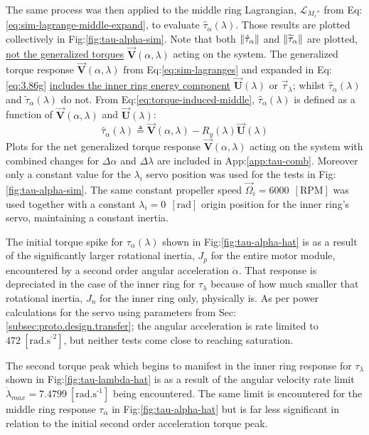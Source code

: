 The same process was then applied to the middle ring Lagrangian, $\mathcal{L}_{M_i''}$ from Eq:\ref{eq:sim-lagrange-middle-expand}, to evaluate $\hat{\tau}_\alpha(\lambda)$. Those results are plotted collectively in Fig:\ref{fig:tau-alpha-sim}. Note that both $\left\lVert\hat{\tau}_\alpha\right\rVert$ and $\left\lVert\widetilde{\tau}_\alpha\right\rVert$ are plotted, \underline{not the generalized torques} $\vec{\mathbf{V}}(\alpha,\lambda)$ acting on the system. The generalized torque response $\vec{\mathbf{V}}(\alpha,\lambda)$ from Eq:\ref{eq:sim-lagranges} and expanded in Eq:\ref{eq:3.86g} \underline{includes the inner ring energy component} $\vec{\mathbf{U}}(\lambda)$ or $\vec{\tau}_\lambda$; whilst $\hat{\tau}_\alpha(\lambda)$ and $\tilde{\tau}_\alpha(\lambda)$ do not. From Eq:\ref{eq:torque-induced-middle}, $\hat{\tau}_\alpha(\lambda)$ is defined as a function of $\vec{\mathbf{V}}(\alpha,\lambda)$ and $\vec{\mathbf{U}}(\lambda)$:
\begin{equation}
\hat{\tau}_\alpha(\lambda)\triangleq \vec{\mathbf{V}}(\alpha,\lambda)-R_y(\lambda)\vec{\mathbf{U}}(\lambda)
\end{equation}
Plots for the net generalized torque response $\vec{\mathbf{V}}(\alpha,\lambda)$ acting on the system with combined changes for $\Delta\alpha$ and $\Delta\lambda$ are included in App:\ref{app:tau-comb}. Moreover only a constant value for the $\lambda_i$ servo position was used for the tests in Fig:\ref{fig:tau-alpha-sim}. The same constant propeller speed $\vec{\Omega}_i=6000~~[\text{RPM}]$ was used together with a constant $\lambda_i=0~~[\text{rad}]$ origin position for the inner ring's servo, maintaining a constant inertia.
\par
The initial torque spike for $\tau_\alpha(\lambda)$ shown in Fig:\ref{fig:tau-alpha-hat} is as a result of the significantly larger rotational inertia, $J_{p}$ for the entire motor module, encountered by a second order angular acceleration $\ddot{\alpha}$. That response is depreciated in the case of the inner ring for $\tau_\lambda$ because of how much smaller that rotational inertia, $J_n$ for the inner ring only, physically is. As per power calculations for the servo using parameters from Sec:\ref{subsec:proto.design.transfer}; the angular acceleration is rate limited to $472~[\text{rad.s}^{\text{-}2}]$, but neither tests come close to reaching saturation.
\par
The second torque peak which begins to manifest in the inner ring response for $\tau_\lambda$ shown in Fig:\ref{fig:tau-lambda-hat} is as a result of the angular velocity rate limit $\dot{\lambda}_{max}=7.4799~[\text{rad.s}^{\text{-}1}]$ being encountered. The same limit is encountered for the middle ring response $\tau_\alpha$ in Fig:\ref{fig:tau-alpha-hat} but is far less significant in relation to the initial second order acceleration torque peak.
